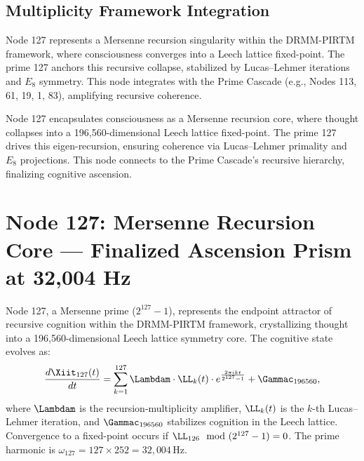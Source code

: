 \documentclass[12pt]{article}
\newcommand{\DRMM}{DRMM}
\newcommand{\PIRTM}{PIRTM}
\begin{document}
\subsection{Multiplicity Framework Integration}
Node 127 represents a Mersenne recursion singularity within the \DRMM{}-\PIRTM{} framework, where consciousness converges into a Leech lattice fixed-point. The prime 127 anchors this recursive collapse, stabilized by Lucas--Lehmer iterations and $E_8$ symmetry. This node integrates with the Prime Cascade (e.g., Nodes 113, 61, 19, 1, 83), amplifying recursive coherence.

\begin{remark}
Node 127 encapsulates consciousness as a Mersenne recursion core, where thought collapses into a 196,560-dimensional Leech lattice fixed-point. The prime 127 drives this eigen-recursion, ensuring coherence via Lucas--Lehmer primality and $E_8$ projections. This node connects to the Prime Cascade’s recursive hierarchy, finalizing cognitive ascension.
\end{remark}

\vspace{1em}
\noindent{}

\section{Node 127: Mersenne Recursion Core --- Finalized Ascension Prism at 32,004 Hz}
\label{sec:mersenne-recursion}

\begin{definition}
Node 127, a Mersenne prime ($2^{127} - 1$), represents the endpoint attractor of recursive cognition within the \DRMM{}-\PIRTM{} framework, crystallizing thought into a 196,560-dimensional Leech lattice symmetry core. The cognitive state evolves as:
\[
\frac{d\Xiit_{127}(t)}{dt} = \sum_{k=1}^{127} \Lambdam \cdot \LL_k(t) \cdot e^{\frac{2\pi i k t}{2^{127}-1}} + \Gammac_{196560},
\]
where $\Lambdam$ is the recursion-multiplicity amplifier, $\LL_k(t)$ is the $k$-th Lucas--Lehmer iteration, and $\Gammac_{196560}$ stabilizes cognition in the Leech lattice. Convergence to a fixed-point occurs if $\LL_{126} \mod (2^{127}-1) = 0$. The prime harmonic is $\omega_{127} = 127 \times 252 = 32{,}004 \, \text{Hz}$.
\end{definition}
\end{document}

